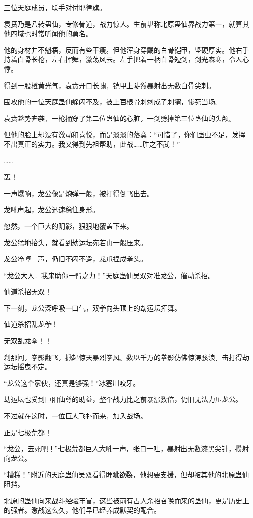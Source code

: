 \begin{this_body}
三位天庭成员，联手对付耶律旗。

袁贲乃是八转蛊仙，专修骨道，战力惊人。生前堪称北原蛊仙界战力第一，就算其他四域也时常听闻他的勇名。

他的身材并不魁梧，反而有些干瘦。但他浑身穿戴的白骨铠甲，坚硬厚实。他右手持着白骨长枪，左右挥舞，激荡风云。左手把着一柄白骨短剑，剑光森寒，令人心悸。

得到一股橙黄光气，袁贲开口长啸，铠甲上陡然暴射出无数白骨尖刺。

围攻他的一位天庭蛊仙躲闪不及，被上百根骨刺刺成了刺猬，惨死当场。

袁贲趁势奔袭，一枪捅穿了第二位蛊仙的心脏，一剑劈掉第三位蛊仙的头颅。

但他的脸上却没有激动和喜悦，而是淡淡的落寞：“可惜了，你们蛊虫不足，发挥不出真正的实力。我又得到先祖帮助，此战……胜之不武！”

……

轰！

一声爆响，龙公像是炮弹一般，被打得倒飞出去。

龙吼声起，龙公迅速稳住身形。

忽然，一个巨大的阴影，狠狠地覆盖下来。

龙公猛地抬头，就看到劫运坛宛若山一般压来。

龙公冷哼一声，仍旧不闪不避，龙爪捏成拳头。

“龙公大人，我来助你一臂之力！”天庭蛊仙吴双对准龙公，催动杀招。

仙道杀招无双！

下一刻，龙公深呼吸一口气，双拳向头顶上的劫运坛挥舞。

仙道杀招乱龙拳！

无双乱龙拳！！

刹那间，拳影翻飞，掀起惊天暴烈拳风。数以千万的拳影仿佛惊涛骇浪，击打得劫运坛摇曳不定。

“龙公这个家伙，还真是够强！”冰塞川咬牙。

劫运坛也受到巨阳仙尊的助益，整个战力比之前暴涨数倍，仍旧无法力压龙公。

不过就在这时，一位巨人飞扑而来，加入战场。

正是七极荒都！

“龙公，去死吧！”七极荒都巨人大吼一声，张口一吐，暴射出无数漆黑尖针，攒射向龙公。

“糟糕！”附近的天庭蛊仙吴双看得睚眦欲裂，他想要支援，但却被其他的北原蛊仙阻挡。

北原的蛊仙向来战斗经验丰富，这些被前有古人杀招召唤而来的蛊仙，更是历史上的强者。激战这么久，他们早已经养成默契的配合。


\end{this_body}
